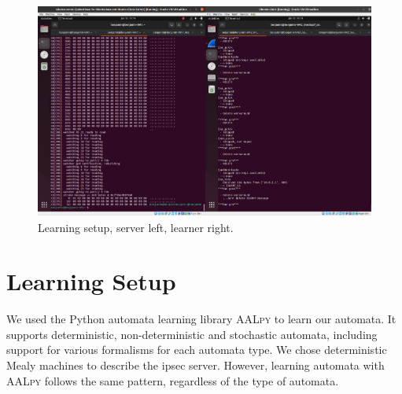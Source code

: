 \begin{figure}
	\centering
	\includegraphics[width=\linewidth]{images/VM_setup}
	\caption{Learning setup, server left, learner right.}
	\label{fig:vmsetup}
\end{figure}

\section{Learning Setup} \label{subsec:learningenv}%
We used the Python automata learning library \textsc{AALpy} to learn our automata. It supports deterministic, non-deterministic and stochastic automata, including support for various formalisms for each automata type. We chose deterministic Mealy machines to describe the \ac{ipsec} server. However, learning automata with \textsc{AALpy} follows the same pattern, regardless of the type of automata.


